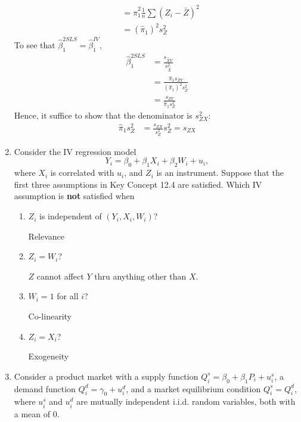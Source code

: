 \documentclass[11pt]{article}
\begin{document}
\begin{enumerate}
\begin{solution}
\begin{align*}
        &= \hat\pi_1^2 \frac{1}{n}\sum (Z_i - \bar Z)^2\\
        &= (\hat \pi_1)^2 s^2_Z
    \end{align*}
    To see that $\hat \beta_1^{2SLS} = \hat\beta_1^{IV},$
    \begin{align*}
        \hat \beta_1^{2SLS} &= \frac{s_{\hat X Y}}{s^2_{\hat X}}\\
        &= \frac{\hat\pi_1 s_{ZY}}{(\hat \pi_1)^2 s^2_Z}\\
        &= \frac{s_{ZY}}{\hat \pi_1 s^2_Z}
    \end{align*}
    Hence, it suffice to show that the denominator is $s^2_{ZX}:$
    \begin{align*}
        \hat\pi_1s^2_Z &=\frac{s_{ZX}}{s^2_{Z}}s^2_Z = s_{ZX}
    \end{align*}
\end{solution}
\item Consider the IV regression model
\[
Y_i = \beta_0 + \beta_1 X_i + \beta_2 W_i + u_i,
\]
where \( X_i \) is correlated with \( u_i \), and \( Z_i \) is an instrument. Suppose that the first three assumptions in Key Concept 12.4 are satisfied. Which IV assumption is \textbf{not} satisfied when

\begin{enumerate}[label=\textbf{\alph*.}]
    \item \( Z_i \) is independent of \( (Y_i, X_i, W_i) \)?
    \begin{solution}
        Relevance
    \end{solution}
    \item \( Z_i = W_i \)?
    \begin{solution}
        $Z$ cannot affect $Y$ thru anything other than $X.$
    \end{solution}
    \item \( W_i = 1 \) for all \( i \)?
    \begin{solution}
        Co-linearity
    \end{solution}
    \item \( Z_i = X_i \)?
    \begin{solution}
        Exogeneity
    \end{solution}
\end{enumerate}
\item Consider a product market with a supply function \( Q_i^s = \beta_0 + \beta_1 P_i + u_i^s \),  
a demand function \( Q_i^d = \gamma_0 + u_i^d \), and a market equilibrium condition \( Q_i^s = Q_i^d \), where \( u_i^s \) and \( u_i^d \) are mutually independent i.i.d. random variables, both with a mean of 0.  


\end{enumerate}
\end{document}

